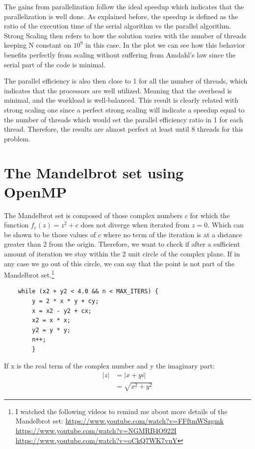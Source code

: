 \documentclass[unicode,11pt,a4paper,oneside,numbers=endperiod,openany]{scrartcl}
\begin{document}
The gains from parallelization follow the ideal speedup which indicates that the parallelization is well done.
As explained before, the speedup is defined as the ratio of the execution time of the serial algorithm vs 
the parallel algorithm. Strong Scaling then refers to how the solution varies with the number of threads keeping 
N constant on $10^9$ in this case. In the plot we can see how this behavior benefits perfectly from scaling without suffering 
from Amdahl's law since the serial part of the code is minimal.

The parallel efficiency is also then close to 1 for all the number of threads, which indicates that the processors are well utilized.
Meaning that the overhead is minimal, and the workload is well-balanced. This result is clearly related with strong scaling one since 
a perfect strong scaling will indicate a speedup equal to the number of threads which would set the parallel efficiency ratio in 1 
for each thread. Therefore, the results are almost perfect at least until 8 threads for this problem.

\section{The Mandelbrot set using OpenMP }
The Mandelbrot set is composed of those complex numbers $c$ for which the function $f_c(z) = z^2 + c$ does not diverge when iterated from $z = 0$.
Which can be shown to be those values of $c$ where no term of the iteration is at a distance greater than 2 from the origin.
Therefore, we want to check if after a sufficient amount of iteration we stay within the 2 unit circle of the complex plane. If in any
case we go out of this circle, we can say that the point is not part of the Mandelbrot set.\footnote{I watched the 
following videos to remind me about more details of the Mandelbrot set:
    \url{https://www.youtube.com/watch?v=FFftmWSzgmk}
    \newline \url{https://www.youtube.com/watch?v=NGMRB4O922I}
    \newline \url{https://www.youtube.com/watch?v=oCkQ7WK7vuY}
}

\begin{lstlisting}
    while (x2 + y2 < 4.0 && n < MAX_ITERS) { 
        y = 2 * x * y + cy;
        x = x2 - y2 + cx;
        x2 = x * x;
        y2 = y * y;
        n++;
        }
\end{lstlisting}

If x is the real term of the complex number and y the imaginary part:
\begin{align*}
    |z| &= |x + yi| \\
    &= \sqrt{x^2 + y^2}
\end{align*} 
\end{document}
